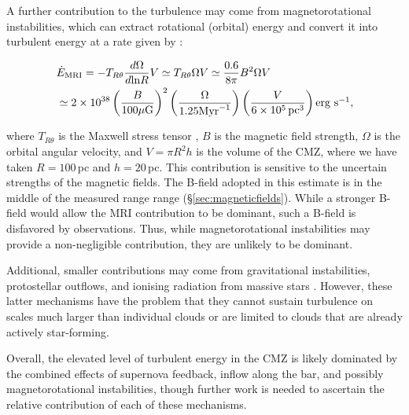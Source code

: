 A further contribution to the turbulence may come from magnetorotational instabilities, which can extract rotational (orbital) energy and convert it into turbulent energy  at a rate given by \citep{Sellwood1999}:

\setlength{\mathindent}{0pt}

\begin{footnotesize}
\begin{align}
    & \dot{E}_{\rm MRI} = -T_{R\theta}\frac{d\Omega}{d\mathrm{ln}R}V \simeq T_{R\theta}\Omega V \simeq \frac{0.6}{8\pi}B^{2}\Omega V \nonumber \\
    & \simeq 2 \times 10^{38} \left( \frac{B}{100 \mu \mathrm{G}} \right)^2 \left(\frac{\Omega}{1.25 \mbox{${\rm Myr}$}^{-1}}\right) \left( \frac{V}{6 \times 10^5 \, \mbox{${\rm pc}$}^3} \right) \mbox{${\rm erg}~{\rm s}^{-1}$},
\end{align}

\end{footnotesize}
%
where $T_{R\theta}$ is the Maxwell stress tensor \citep[the approximation $T_{R\theta}\simeq \frac{0.6}{8\pi}B^{2}$ is determined from numerical models;][]{Hawley1995}, $B$ is the magnetic field strength, $\Omega$ is the orbital angular velocity, and $V=\pi R^{2}h$ is the volume of the CMZ, where we have taken $R=100$\,pc and $h=20$\,pc. 
This contribution is sensitive to the uncertain strengths of the magnetic fields. The B-field adopted in this estimate is in the middle of the measured range range (\S \ref{sec:magneticfields}).
While a stronger B-field would allow the MRI contribution to be dominant, such a B-field is disfavored by observations. Thus, while magnetorotational instabilities may provide a non-negligible contribution, they are unlikely to be dominant. 

Additional, smaller contributions may come from gravitational instabilities, protostellar outflows, and ionising radiation from massive stars \citep{MacLow2004,Kruijssen2014a}. However, these latter mechanisms have the problem that they cannot sustain turbulence on scales much larger than individual clouds or are limited to clouds that are already actively star-forming.

Overall, the elevated level of turbulent energy in the CMZ is likely dominated by the combined effects of supernova feedback, inflow along the bar, and possibly magnetorotational instabilities, though further work is needed to ascertain the relative contribution of each of these mechanisms. 